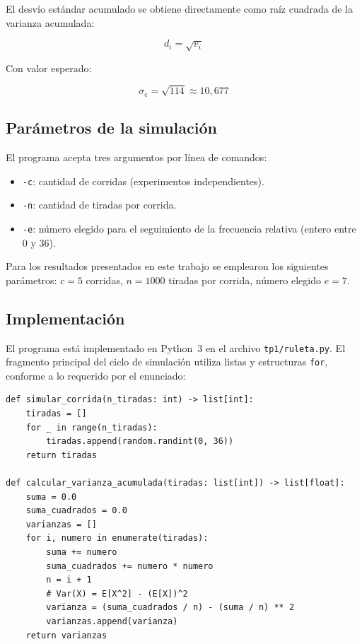 \documentclass[a4paper, 11pt]{article}
\begin{document}
El desvío estándar acumulado se obtiene directamente como raíz cuadrada de la
varianza acumulada:

\begin{equation}
  d_i = \sqrt{v_i}
  \label{eq:desvio}
\end{equation}

Con valor esperado:

\begin{equation}
  \sigma_e = \sqrt{114} \approx 10{,}677
  \label{eq:desvio_esperado}
\end{equation}

\subsection{Parámetros de la simulación}

El programa acepta tres argumentos por línea de comandos:

\begin{itemize}
  \item \texttt{-c}: cantidad de corridas (experimentos independientes).
  \item \texttt{-n}: cantidad de tiradas por corrida.
  \item \texttt{-e}: número elegido para el seguimiento de la frecuencia
        relativa (entero entre 0 y 36).
\end{itemize}

Para los resultados presentados en este trabajo se emplearon los siguientes
parámetros: $c = 5$ corridas, $n = 1000$ tiradas por corrida, número
elegido $e = 7$.

\subsection{Implementación}

El programa está implementado en Python~3 en el archivo \texttt{tp1/ruleta.py}.
El fragmento principal del ciclo de simulación utiliza listas y estructuras
\texttt{for}, conforme a lo requerido por el enunciado:

\begin{lstlisting}[style=python, caption={Simulación de una corrida con cómputo de varianza acumulada (fórmula online).}]
def simular_corrida(n_tiradas: int) -> list[int]:
    tiradas = []
    for _ in range(n_tiradas):
        tiradas.append(random.randint(0, 36))
    return tiradas

def calcular_varianza_acumulada(tiradas: list[int]) -> list[float]:
    suma = 0.0
    suma_cuadrados = 0.0
    varianzas = []
    for i, numero in enumerate(tiradas):
        suma += numero
        suma_cuadrados += numero * numero
        n = i + 1
        # Var(X) = E[X^2] - (E[X])^2
        varianza = (suma_cuadrados / n) - (suma / n) ** 2
        varianzas.append(varianza)
    return varianzas
\end{lstlisting}
\end{document}
